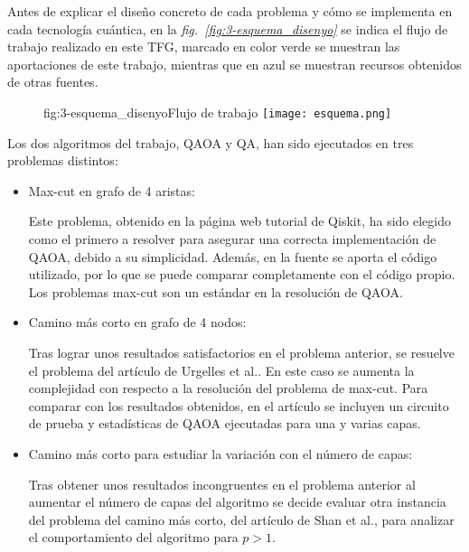 Antes de explicar el diseño concreto de cada problema y cómo se implementa en cada tecnología cuántica, en la \textit{fig.~\ref{fig:3-esquema_disenyo}} se indica el flujo de trabajo realizado en este TFG, marcado en color verde se muestran las aportaciones de este trabajo, mientras que en azul se muestran recursos obtenidos de otras fuentes.

\begin{figure}[Flujo de trabajo]{fig:3-esquema_disenyo}{Flujo de trabajo}
  \centering
  \texttt{[image: esquema.png]}
\end{figure}

Los dos algoritmos del trabajo, QAOA y QA, han sido ejecutados en tres problemas distintos:

\begin{itemize}
\item Max-cut en grafo de 4 aristas:

  Este problema, obtenido en la página web tutorial de Qiskit\cite{qiskit_tutorial_antiguo}, ha sido elegido como el primero a resolver para asegurar una correcta implementación de QAOA, debido a su simplicidad.
  Además, en la fuente se aporta el código utilizado, por lo que se puede comparar completamente con el código propio.
  Los problemas max-cut son un estándar en la resolución de QAOA.

\item Camino más corto en grafo de 4 nodos:

  Tras lograr unos resultados satisfactorios en el problema anterior, se resuelve el problema del artículo de Urgelles et al.\cite{multi-objective_routing_optimization}.
  En este caso se aumenta la complejidad con respecto a la resolución del problema de max-cut.
  Para comparar con los resultados obtenidos, en el artículo se incluyen un circuito de prueba y estadísticas de QAOA ejecutadas para una y varias capas.

\item Camino más corto para estudiar la variación con el número de capas:

  Tras obtener unos resultados incongruentes en el problema anterior al aumentar el número de capas del algoritmo se decide evaluar otra instancia del problema del camino más corto, del artículo de Shan et al.\cite{solving_shortest_path_with_qaoa}, para analizar el comportamiento del algoritmo para $p > 1$.
\end{itemize}


